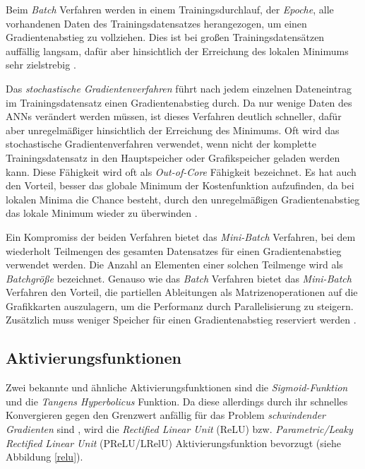 Beim \textit{Batch} Verfahren werden in einem Trainingsdurchlauf, der \textit{Epoche}, alle vorhandenen Daten des Trainingsdatensatzes herangezogen, um einen Gradientenabstieg zu vollziehen. Dies ist bei großen Trainingsdatensätzen auffällig langsam, dafür aber hinsichtlich der Erreichung des lokalen Minimums sehr zielstrebig \cite{AurelienGeron.2018}.

Das \textit{stochastische Gradientenverfahren} führt nach jedem einzelnen Dateneintrag im Trainingsdatensatz einen Gradientenabstieg durch. Da nur wenige Daten des ANNs verändert werden müssen, ist dieses Verfahren deutlich schneller, dafür aber unregelmäßiger hinsichtlich der Erreichung des Minimums. Oft wird das stochastische Gradientenverfahren verwendet, wenn nicht der komplette Trainingsdatensatz in den Hauptspeicher oder Grafikspeicher geladen werden kann. Diese Fähigkeit wird oft als \textit{Out-of-Core} Fähigkeit bezeichnet. Es hat auch den Vorteil, besser das globale Minimum der Kostenfunktion aufzufinden, da bei lokalen Minima die Chance besteht, durch den unregelmäßigen Gradientenabstieg das lokale Minimum wieder zu überwinden \cite{AurelienGeron.2018}.

Ein Kompromiss der beiden Verfahren bietet das \textit{Mini-Batch} Verfahren, bei dem wiederholt Teilmengen des gesamten Datensatzes für einen Gradientenabstieg verwendet werden. Die Anzahl an Elementen einer solchen Teilmenge wird als \textit{Batchgröße} bezeichnet. Genauso wie das \textit{Batch} Verfahren bietet das \textit{Mini-Batch} Verfahren den Vorteil, die partiellen Ableitungen als Matrizenoperationen auf die Grafikkarten auszulagern, um die Performanz durch Parallelisierung zu steigern. Zusätzlich muss weniger Speicher für einen Gradientenabstieg reserviert werden \cite{AurelienGeron.2018}.

\subsection*{Aktivierungsfunktionen}

Zwei bekannte und ähnliche Aktivierungsfunktionen sind die \textit{Sigmoid-Funktion} und die \textit{Tangens Hyperbolicus} Funktion. Da diese allerdings durch ihr schnelles Konvergieren gegen den Grenzwert anfällig für das Problem \textit{schwindender Gradienten} sind \cite{AurelienGeron.2018}, wird die \textit{Rectified Linear Unit} (ReLU) bzw. \textit{Parametric/Leaky Rectified Linear Unit} (PReLU/LRelU) Aktivierungsfunktion bevorzugt (siehe Abbildung \ref{relu}). 

